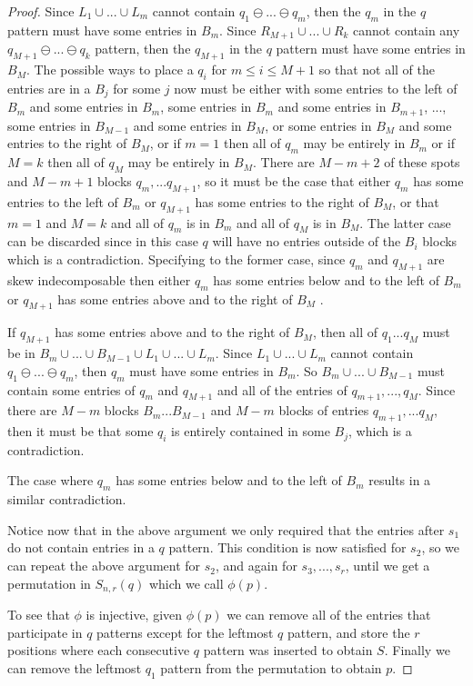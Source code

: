 \documentclass[11pt, final]{amsart}
\theoremstyle{remark}
\numberwithin{equation}{section}
\begin{document}
\begin{proof}
    Since $L_1 \cup ... \cup L_m$ cannot contain $q_1 \ominus ... \ominus q_m$, then the $q_m$ in the $q$ pattern must have some entries in $B_m$. Since $R_{M+1} \cup ... \cup R_k$ cannot contain any $q_{M+1} \ominus ... \ominus q_k$ pattern, then the $q_{M+1}$ in the $q$ pattern must have some entries in $B_M$. The possible ways to place a $q_i$ for $m\leq i \leq M+1$ so that not all of the entries are in a $B_j$ for some $j$ now must be either with some entries to the left of $B_m$ and some entries in $B_m$, some entries in $B_m$ and some entries in $B_{m+1}$, ..., some entries in $B_{M-1}$ and some entries in $B_M$, or some entries in $B_M$ and some entries to the right of $B_M$, or if $m = 1$ then all of $q_m$ may be entirely in $B_m$ or if $M = k$ then all of $q_M$ may be entirely in $B_M$. There are $M-m + 2$ of these spots and $M-m + 1$ blocks $q_m, ... q_{M+1}$, so it must be the case that either $q_m$ has some entries to the left of $B_m$ or $q_{M+1}$ has some entries to the right of $B_M$, or that $m=1$ and $M=k$ and all of $q_m$ is in $B_m$ and all of $q_M$ is in $B_M$. The latter case can be discarded since in this case $q$ will have no entries outside of the $B_i$ blocks which is a contradiction. Specifying to the former case, since $q_m$ and $q_{M+1}$ are skew indecomposable then either $q_m$ has some entries below and to the left of $B_m$ or $q_{M+1}$ has some entries above and to the right of $B_M$ .
    
    If $q_{M+1}$ has some entries above and to the right of $B_M$, then all of $q_1 ... q_M$ must be in $B_m \cup ... \cup B_{M-1} \cup L_1 \cup ...\cup L_m$. Since $L_1 \cup ...\cup  L_m$ cannot contain $q_1 \ominus ... \ominus q_m$, then $q_m$ must have some entries in $B_m$. So $B_m \cup ... \cup B_{M-1}$ must contain some entries of $q_m$ and $q_{M+1}$ and all of the entries of $q_{m+1}, ..., q_M$. Since there are $M-m$ blocks $B_m ... B_{M-1}$ and $M-m$ blocks of entries $q_{m+1}, ... q_M$, then it must be that some $q_i$ is entirely contained in some $B_j$, which is a contradiction.

    The case where $q_m$ has some entries below and to the left of $B_m$ results in a similar contradiction.
    

    
    Notice now that in the above argument we only required that the entries after $s_1$ do not contain entries in a $q$ pattern. This condition is now satisfied for $s_2$, so we can repeat the above argument for $s_2$, and again for $s_3, ..., s_{r}$, until we get a permutation in $S_{n,r}(q)$ which we call $\phi(p)$.

    To see that $\phi$ is injective, given $\phi(p)$ we can remove all of the entries that participate in $q$ patterns except for the leftmost $q$ pattern, and store the $r$ positions where each consecutive $q$ pattern was inserted to obtain $S$. Finally we can remove the leftmost $q_1$ pattern from the permutation to obtain $p$.
\end{proof}
\end{document}
